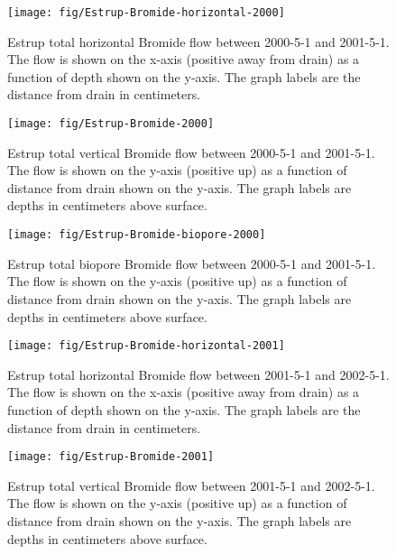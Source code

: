 \begin{figure}[htbp]
  \centering
  \texttt{[image: fig/Estrup-Bromide-horizontal-2000]}
  
  \caption{Estrup total horizontal Bromide flow between 2000-5-1 and
    2001-5-1.  The flow is shown on the x-axis (positive away from
    drain) as a function of depth shown on the y-axis.  The graph
    labels are the distance from drain in centimeters.}
  \label{fig:Estrup-Bromide-2000-horizontal}
\end{figure}\FloatBarrier

\begin{figure}[htbp]
  \centering
  \texttt{[image: fig/Estrup-Bromide-2000]}
  
  \caption{Estrup total vertical Bromide flow between 2000-5-1 and
    2001-5-1.  The flow is shown on the y-axis (positive up) as a
    function of distance from drain shown on the y-axis.  The graph
    labels are depths in centimeters above surface.}
  \label{fig:Estrup-Bromide-2000-vertical}
\end{figure}\FloatBarrier

\begin{figure}[htbp]
  \centering
  \texttt{[image: fig/Estrup-Bromide-biopore-2000]}
  
  \caption{Estrup total biopore Bromide flow between 2000-5-1 and
    2001-5-1.  The flow is shown on the y-axis (positive up) as a
    function of distance from drain shown on the y-axis.  The graph
    labels are depths in centimeters above surface.}
  \label{fig:Estrup-Bromide-biopore-2000}
\end{figure}\FloatBarrier

\begin{figure}[htbp]
  \centering
  \texttt{[image: fig/Estrup-Bromide-horizontal-2001]}
  
  \caption{Estrup total horizontal Bromide flow between 2001-5-1 and
    2002-5-1.  The flow is shown on the x-axis (positive away from
    drain) as a function of depth shown on the y-axis.  The graph
    labels are the distance from drain in centimeters.}
  \label{fig:Estrup-Bromide-2001-horizontal}
\end{figure}\FloatBarrier

\begin{figure}[htbp]
  \centering
  \texttt{[image: fig/Estrup-Bromide-2001]}
  
  \caption{Estrup total vertical Bromide flow between 2001-5-1 and
    2002-5-1.  The flow is shown on the y-axis (positive up) as a
    function of distance from drain shown on the y-axis.  The graph
    labels are depths in centimeters above surface.}
  \label{fig:Estrup-Bromide-2001-vertical}
\end{figure}\FloatBarrier

